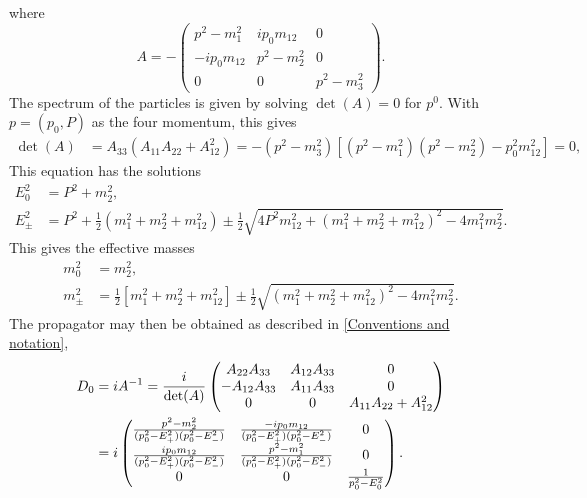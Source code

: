 where
\begin{equation*}
    A = -
    \begin{pmatrix}
        p^2 - m^2_1             & i p_0 m_{12}     & 0             \\
        - i p_0 m_{12}            & p^2 - m^2_2       & 0             \\
        0                       & 0                 & p^2 - m^2_3
    \end{pmatrix}.
\end{equation*}
The spectrum of the particles is given by solving $\det(A) = 0$ for $p^0$. With $p = (p_0, P)$ as the four momentum, this gives
\begin{align*}
    \det(A) & = A_{33} \left(A_{11} A_{22} + A_{12}^2\right)
    = - \left(p^2 - m^2_3\right)
    \left[
        \left(p^2 - m^2_1\right)
        \left(p^2 - m^2_2\right)
        - p_0^2 m_{12}^2
    \right] = 0,
\end{align*}
This equation has the solutions
\begin{align}
    E_0^2 &= P^2 + m_2^2, \\
    E_\pm^2
    & = P^2 +
    \frac{1}{2}
    \left(
        m_1^2 + m_2^2 + m_{12}^2 
    \right)
    \pm 
    \frac{1}{2}
    \sqrt{
        4P^2m_{12}^2 
        +
        \left(
            m_1^2 + m_2^2 + m_{12}^2
        \right)^2
        - 4 m_1^2 m_2^2
    }.
\end{align}
This gives the effective masses
\begin{align}
    m_0^2 &= m_2^2, \\
    m_\pm^2
    & =  \frac{1}{2}
    \left[
        m_1^2 + m_2^2 + m_{12}^2 
    \right]
    \pm \frac{1}{2}
    \sqrt{
        \left(
            m_1^2 + m_2^2 + m_{12}^2
        \right)^2
        - 4 m_1^2 m_2^2
    }.
\end{align}
The propagator may then be obtained as described in \autoref{Conventions and notation},
\begin{align}
    \notag
    D_0 & = i A^{-1} = \frac{i}{\det(A)}
    \begin{pmatrix}
        A_{22} A_{33}   & A_{12}A_{33}  & 0 \\
        -A_{12}A_{33}   & A_{11}A_{33}  & 0 \\
        0               & 0             & A_{11}A_{22} + A_{12}^2
    \end{pmatrix} \\
    \label{free pion propagator}
    & = i
    \begin{pmatrix}
        \frac{
            p^2 - m_2^2
        }
        {
            (p_0^2 - E_+^2)(p_0^2 - E_-^2)
        } 
        & \frac{
            - ip_0m_{12}
        }
        {
            (p_0^2 - E_+^2)(p_0^2 - E_-^2)
        } & 0 \\
        \frac{
            ip_0m_{12}
        }
        {
            (p_0^2 - E_+^2)(p_0^2 - E_-^2)
        }
        & \frac{
            p^2 - m_1^2
        }
        {
            (p_0^2 - E_+^2)(p_0^2 - E_-^2)
        } & 0 \\
        0 & 0 & 
        \frac{1}{p_0^2 - E_0^2}
    \end{pmatrix}.
\end{align}
